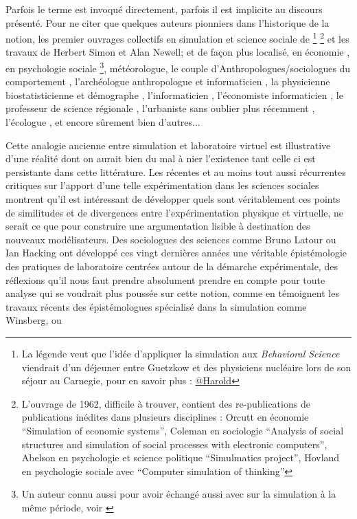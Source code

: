 Parfois le terme est invoqué directement, parfois il est implicite au discours présenté. Pour ne citer que quelques auteurs pionniers dans l'historique de la notion, les premier ouvrages collectifs en simulation et science sociale de \textcite{Borko1962, Guetzkow1962, Guetzkow1972} \footnote{La légende veut que l'idée d'appliquer la simulation aux \textit{Behavioral Science} viendrait d'un déjeuner entre Guetzkow et des physiciens nucléaire lors de son séjour au Carnegie, pour en savoir plus : \href{http://www.hawaii.edu/intlrel/pols635f/Guetzkow/hg.html}{@Harold} } \footnote{L'ouvrage de 1962, difficile à trouver, contient des re-publications de publications inédites dans plusieurs disciplines : Orcutt en économie \foreignquote{english}{Simulation of economic systems}, Coleman en sociologie \foreignquote{english}{Analysis of social structures and simulation of social processes with electronic computers}, Abelson en psychologie et science politique \foreignquote{english}{Simulmatics project},  Hovland en psychologie sociale avec \foreignquote{english}{Computer simulation of thinking} } et les travaux de Herbert Simon et Alan Newell; et de façon plus localisé, en économie \textcite[915]{Shubik1960b}, en psychologie sociale \textcite{Abelson1968} \footnote{Un auteur connu aussi pour avoir échangé aussi avec \textcite{Boudon1967} sur la simulation à la même période, voir  \textcite{Padioleau1969}}, \textcite{Fleisher1965} météorologue, le couple d'Anthropologues/sociologues du comportement \textcite{Gullahorn1965}, l'archéologue anthropologue et informaticien \textcite{Doran1970}, la physicienne biostatisticienne et démographe \textcite{Sheps1971}, l'informaticien \textcite[3-4]{Forrester1971}, l'économiste informaticien \textcite{Naylor1966}, le professeur de science régionale \textcite[271]{Harris1966}, l'urbaniste \textcite[295]{Batty1976} sans oublier plus récemment \textcite{Epstein1996}, l'écologue \textcite{Grimm2006}, et encore sûrement bien d'autres...

Cette analogie ancienne entre simulation et laboratoire virtuel est illustrative d'une réalité dont on aurait bien du mal à nier l'existence tant celle ci est persistante dans cette littérature. Les récentes et au moins tout aussi récurrentes critiques sur l'apport d'une telle expérimentation dans les sciences sociales montrent qu'il est intéressant de développer quels sont véritablement ces points de similitudes et de divergences entre l'expérimentation physique et virtuelle, ne serait ce que pour construire une argumentation lisible à destination des nouveaux modélisateurs. Des sociologues des sciences comme Bruno Latour ou Ian Hacking ont développé ces vingt dernières années une véritable épistémologie des pratiques de laboratoire centrées autour de la démarche expérimentale, des réflexions qu'il nous faut prendre absolument prendre en compte pour toute analyse qui se voudrait plus poussée sur cette notion, comme en témoignent les travaux récents des épistémologues spécialisé dans la simulation comme Winsberg, ou \textcite[204]{Varenne2012}


